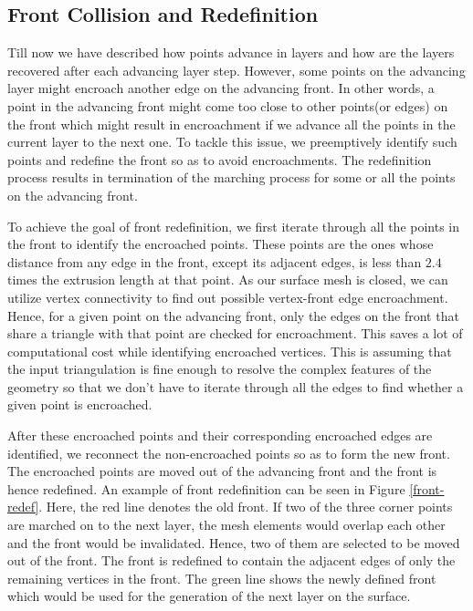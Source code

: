 \documentclass[conf]{new-aiaa}
\begin{document}
\begin{figure}[hbt!]
\label{interior-vert-collapse}
\end{figure}



\subsection{Front Collision and Redefinition}

Till now we have described how points advance in layers and how are the layers recovered after each advancing layer step. However, some points on the advancing layer might encroach another edge on the advancing front. In other words, a point in the advancing front might come too close to other points(or edges) on the front which might result in encroachment if we advance all the points in the current layer to the next one. To tackle this issue, we preemptively identify such points and redefine the front so as to avoid encroachments. The redefinition process results in termination of the marching process for some or all the points on the advancing front.

To achieve the goal of front redefinition, we first iterate through all the points in the front to identify the encroached points. These points are the ones whose distance from any edge in the front, except its adjacent edges, is less than $2.4$ times the extrusion length at that point. As our surface mesh is closed, we can utilize vertex connectivity to find out possible vertex-front edge encroachment. Hence, for a given point on the advancing front, only the edges on the front that share a triangle with that point are checked for encroachment. This saves a lot of computational cost while identifying encroached vertices. This is assuming that the input triangulation is fine enough to resolve the complex features of the geometry so that we don't have to iterate through all the edges to find whether a given point is encroached. 

After these encroached points and their corresponding encroached edges are identified, we reconnect the non-encroached points so as to form the new front. The encroached points are moved out of the advancing front and the front is hence redefined. An example of front redefinition can be seen in Figure \ref{front-redef}. Here, the red line denotes the old front. If two of the three corner points are marched on to the next layer, the mesh elements would overlap each other and the front would be invalidated. Hence, two of them are selected to be moved out of the front. The front is redefined to contain the adjacent edges of only the remaining vertices in the front. The green line shows the newly defined front which would be used for the generation of the next layer on the surface.
\end{document}

